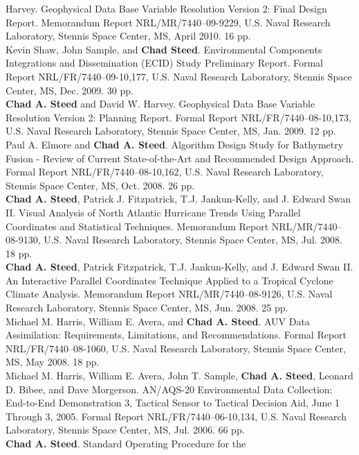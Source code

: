 \documentclass[11pt, a4paper]{article}
\newcommand{\years}[1]{\marginnote{\scriptsize #1}}
\begin{document}
\begin{sloppypar}
Harvey. Geophysical Data Base Variable Resolution Version 2: Final Design
Report. Memorandum Report NRL/MR/7440--09-9229, U.S. Naval Research
Laboratory, Stennis Space Center, MS, April 2010. 16 pp.\\
\years{2009}Kevin Shaw, John Sample, and \textbf{Chad Steed}. Environmental
Components Integrations and Dissemination (ECID) Study Preliminary Report.
Formal Report NRL/FR/7440--09-10,177, U.S. Naval Research Laboratory, Stennis
Space Center, MS, Dec. 2009. 30 pp.\\
\years{2009}\textbf{Chad A. Steed} and David W. Harvey. Geophysical Data Base
Variable Resolution Version 2: Planning Report. Formal Report
NRL/FR/7440–08-10,173, U.S. Naval Research Laboratory, Stennis Space Center,
MS, Jan. 2009. 12 pp.\\
\years{2008}Paul A. Elmore and \textbf{Chad A. Steed}. Algorithm Design Study
for Bathymetry Fusion - Review of Current State-of-the-Art and Recommended
Design Approach. Formal Report NRL/FR/7440–08-10,162, U.S. Naval Research
Laboratory, Stennis Space Center, MS, Oct. 2008. 26 pp.\\
\years{2008}\textbf{Chad A. Steed}, Patrick J. Fitzpatrick, T.J. Jankun-Kelly,
and J. Edward Swan II. Visual Analysis of North Atlantic Hurricane Trends
Using Parallel Coordinates and Statistical Techniques. Memorandum Report
NRL/MR/7440–08-9130, U.S. Naval Research Laboratory, Stennis Space Center,
MS, Jul. 2008. 18 pp.\\
\years{2008}\textbf{Chad A. Steed}, Patrick Fitzpatrick, T.J. Jankun-Kelly,
and J. Edward Swan II. An Interactive Parallel Coordinates Technique Applied
to a Tropical Cyclone Climate Analysis. Memorandum Report NRL/MR/7440–08-9126,
U.S. Naval Research Laboratory, Stennis Space Center, MS, Jun. 2008. 25 pp.\\
\years{2008}Michael M. Harris, William E. Avera, and \textbf{Chad A. Steed}.
AUV Data Assimilation: Requirements, Limitations, and Recommendations.
Formal Report NRL/FR/7440–08-1060, U.S. Naval Research Laboratory, Stennis
Space Center, MS, May 2008. 18 pp.\\
\years{2006}Michael M. Harris, William E. Avera, John T. Sample,
\textbf{Chad A. Steed}, Leonard D. Bibee, and Dave Morgerson. AN/AQS-20
Environmental Data Collection: End-to-End Demonstration 3, Tactical Sensor to
Tactical Decision Aid, June 1 Through 3, 2005. Formal Report
NRL/FR/7440–06-10,134, U.S. Naval Research Laboratory, Stennis Space Center,
MS, Jul. 2006. 66 pp.\\
\years{2006}\textbf{Chad A. Steed}. Standard Operating Procedure for the

\end{sloppypar}
\end{document}
